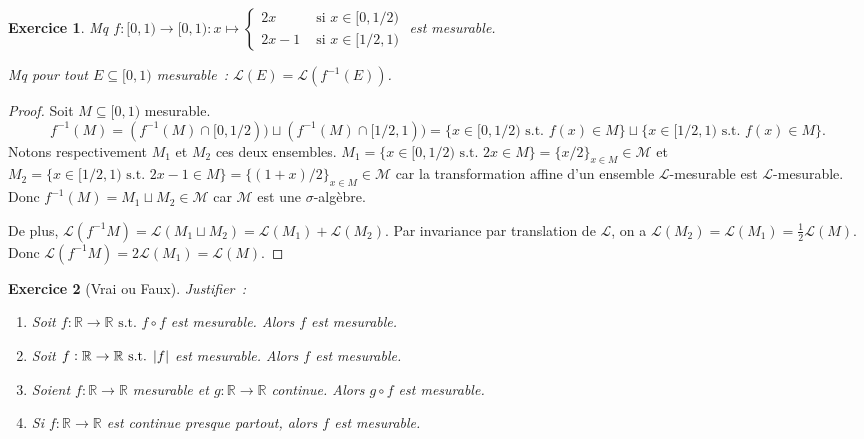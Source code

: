 \documentclass{article}
\newtheorem{ex}{Exercice}[section]
\newcommand{\st}{\text{ s.t. }}
\newcommand{\R}{{\mathbb R}}
\begin{document}
\begin{ex} Mq $f : [0, 1) \to [0, 1) : x \mapsto \begin{cases}2x & \text{ si } x \in [0, 1/2) \\ 2x-1 & \text{ si } x \in [1/2, 1)\end{cases}$ est mesurable.

Mq pour tout $E \subseteq [0, 1)$ mesurable~: $\mathcal L(E) = \mathcal L(f^{-1}(E))$.
\end{ex}

\begin{proof} Soit $M \subseteq [0, 1)$ mesurable.
\[f^{-1}(M) = (f^{-1}(M) \cap [0, 1/2)) \sqcup (f^{-1}(M) \cap [1/2, 1)) = \{x \in [0, 1/2) \st f(x) \in M\} \sqcup \{x \in [1/2, 1) \st f(x) \in M\}.\]
Notons respectivement $M_1$ et $M_2$ ces deux ensembles. $M_1 = \{x \in [0, 1/2) \st 2x \in M\} = \{x/2\}_{x \in M} \in \mathcal M$ et
$M_2 = \{x \in [1/2, 1) \st 2x-1 \in M\} = \{(1+x)/2\}_{x \in M} \in \mathcal M$ car la transformation affine d'un ensemble $\mathcal L$-mesurable
est $\mathcal L$-mesurable. Donc $f^{-1}(M) = M_1 \sqcup M_2 \in \mathcal M$ car $\mathcal M$ est une $\sigma$-algèbre.

De plus, $\mathcal L(f^{-1}M) = \mathcal L(M_1 \sqcup M_2) = \mathcal L(M_1) + \mathcal L(M_2)$. Par invariance par translation de $\mathcal L$, on a
$\mathcal L(M_2) = \mathcal L(M_1) = \frac 12\mathcal L(M)$. Donc $\mathcal L(f^{-1}M) = 2\mathcal L(M_1) = \mathcal L(M)$.
\end{proof}

\begin{ex}[Vrai ou Faux]\label{ex:4.8} Justifier~:
\begin{enumerate}
	\item Soit $f : \R \to \R \st f \circ f$ est mesurable. Alors $f$ est mesurable.
	\item Soit $f : \R \to \R \st \abs f$ est mesurable. Alors $f$ est mesurable.
	\item Soient $f : \R \to \R$ mesurable et $g : \R \to \R$ continue. Alors $g \circ f$ est mesurable.
	\item Si $f : \R \to \R$ est continue presque partout, alors $f$ est mesurable.
\end{enumerate}
\end{ex}
\end{document}
